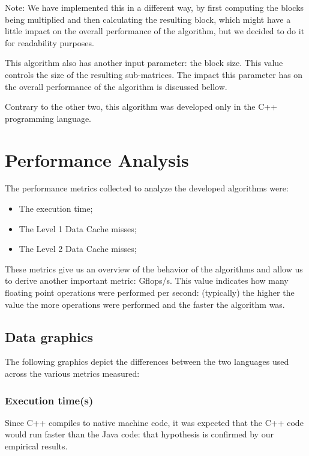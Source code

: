\documentclass[11pt,a4paper]{article}
\begin{document}
Note: We have implemented this in a different way, by first computing the blocks being multiplied and then calculating the resulting block, which might have a little impact on the overall performance of the algorithm, but we decided to do it for readability purposes.

This algorithm also has another input parameter: the block size. This value controls the size of the resulting sub-matrices. The impact this parameter has on the overall performance of the algorithm is discussed bellow.

Contrary to the other two, this algorithm was developed only in the C++ programming language.

\section{Performance Analysis}

The performance metrics collected to analyze the developed algorithms were:

\begin{itemize}
    \item The execution time;
    \item The Level 1 Data Cache misses;
    \item The Level 2 Data Cache misses;
\end{itemize}

These metrics give us an overview of the behavior of the algorithms and allow us to derive another important metric: Gflops/s. This value indicates how many floating point operations were performed per second: (typically) the higher the value the more operations were performed and the faster the algorithm was.

\subsection{Data graphics}

The following graphics depict the differences between the two languages used across the various metrics measured:

\subsubsection{Execution time(\unit{\second})}

Since C++ compiles to native machine code, it was expected that the C++ code would run faster than the Java code: that hypothesis is confirmed by our empirical results.
\end{document}
